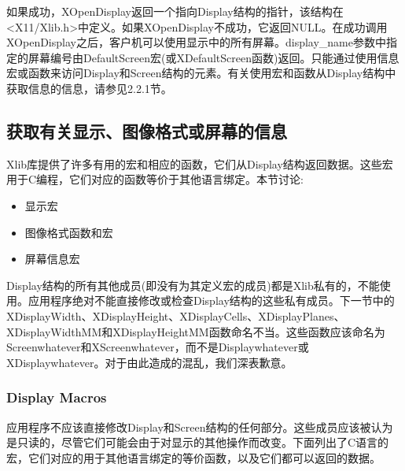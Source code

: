 如果成功，XOpenDisplay返回一个指向Display结构的指针，该结构在<X11/Xlib.h>中定义。如果XOpenDisplay不成功，它返回NULL。在成功调用XOpenDisplay之后，客户机可以使用显示中的所有屏幕。display\_name参数中指定的屏幕编号由DefaultScreen宏(或XDefaultScreen函数)返回。只能通过使用信息宏或函数来访问Display和Screen结构的元素。有关使用宏和函数从Display结构中获取信息的信息，请参见2.2.1节。

\subsection{获取有关显示、图像格式或屏幕的信息}

Xlib库提供了许多有用的宏和相应的函数，它们从Display结构返回数据。这些宏用于C编程，它们对应的函数等价于其他语言绑定。本节讨论:

\begin{itemize}
	\item 显示宏
	\item 图像格式函数和宏
	\item 屏幕信息宏
\end{itemize}

Display结构的所有其他成员(即没有为其定义宏的成员)都是Xlib私有的，不能使用。应用程序绝对不能直接修改或检查Display结构的这些私有成员。下一节中的XDisplayWidth、XDisplayHeight、XDisplayCells、XDisplayPlanes、XDisplayWidthMM和XDisplayHeightMM函数命名不当。这些函数应该命名为Screenwhatever和XScreenwhatever，而不是Displaywhatever或XDisplaywhatever。对于由此造成的混乱，我们深表歉意。

\subsubsection{Display Macros}

应用程序不应该直接修改Display和Screen结构的任何部分。这些成员应该被认为是只读的，尽管它们可能会由于对显示的其他操作而改变。下面列出了C语言的宏，它们对应的用于其他语言绑定的等价函数，以及它们都可以返回的数据。

